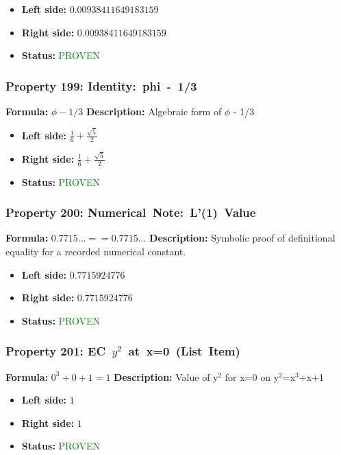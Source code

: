 \begin{itemize}
\item \textbf{Left side:} $0.00938411649183159$
\item \textbf{Right side:} $0.00938411649183159$
\item \textbf{Status:} \textcolor{green}{PROVEN}
\end{itemize}

\subsubsection*{Property 199: Identity:~phi~-~1/3}
\textbf{Formula:} $\phi - 1/3$
\textbf{Description:} Algebraic form of $\phi$ - 1/3

\begin{itemize}
\item \textbf{Left side:} $\frac{1}{6} + \frac{\sqrt{5}}{2}$
\item \textbf{Right side:} $\frac{1}{6} + \frac{\sqrt{5}}{2}$
\item \textbf{Status:} \textcolor{green}{PROVEN}
\end{itemize}

\subsubsection*{Property 200: Numerical~Note:~L'(1)~Value}
\textbf{Formula:} $0.7715... == 0.7715...$
\textbf{Description:} Symbolic proof of definitional equality for a recorded numerical constant.

\begin{itemize}
\item \textbf{Left side:} $0.7715924776$
\item \textbf{Right side:} $0.7715924776$
\item \textbf{Status:} \textcolor{green}{PROVEN}
\end{itemize}

\subsubsection*{Property 201: EC~$y^{2}$~at~x=0~(List~Item)}
\textbf{Formula:} $0^3+0+1=1$
\textbf{Description:} Value of y$^2$ for x=0 on y$^2$=x$^3$+x+1

\begin{itemize}
\item \textbf{Left side:} $1$
\item \textbf{Right side:} $1$
\item \textbf{Status:} \textcolor{green}{PROVEN}
\end{itemize}

